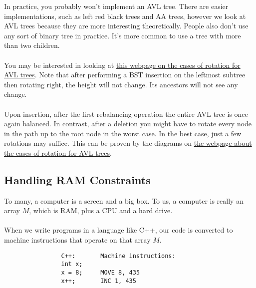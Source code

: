 \documentclass[]{article}
\theoremstyle{definition}
\newcommand{\lecture}[1]{\marginpar{{\footnotesize $\leftarrow$ \underline{#1}}}}
\begin{document}
				In practice, you probably won't implement an AVL tree. There are easier implementations, such as left red black trees and AA trees, however we look at AVL trees because they are more interesting theoretically. People also don't use any sort of binary tree in practice. It's more common to use a tree with more than two children. \lecture{February 12, 2013}
				\\ \\
				You may be interested in looking at \href{http://cs-study.blogspot.ca/2012/11/cases-of-rotation-of-avl-tree.html}{this webpage on the cases of rotation for AVL trees}. Note that after performing a BST insertion on the leftmost subtree then rotating right, the height will not change. Its ancestors will not see any change.
				\\ \\
				Upon insertion, after the first rebalancing operation the entire AVL tree is once again balanced. In contrast, after a deletion you might have to rotate every node in the path up to the root node in the worst case. In the best case, just a few rotations may suffice. This can be proven by the diagrams on \href{http://cs-study.blogspot.ca/2012/11/cases-of-rotation-of-avl-tree.html}{the webpage about the cases of rotation for AVL trees}.

		\subsection{Handling RAM Constraints}
			To many, a computer is a screen and a big box. To us, a computer is really an array $M$, which is RAM, plus a CPU and a hard drive.
			\\ \\
			When we write programs in a language like C++, our code is converted to machine instructions that operate on that array $M$.
			\begin{verbatim}
				C++:       Machine instructions:
				int x;
				x = 8;     MOVE 8, 435
				x++;       INC 1, 435
			\end{verbatim}
\end{document}

